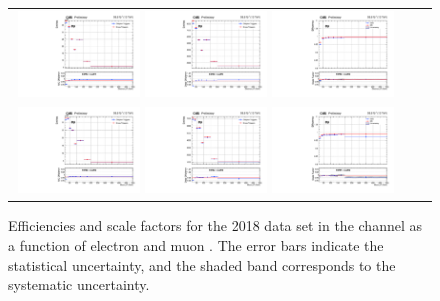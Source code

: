 {\begin{figure}[h]
  \begin{center}
    \begin{tabular}{ccc}
      \includegraphics[width=0.32\textwidth]{fig_2018_TrigSF/g_lepApt_emu_MC.pdf}
      \includegraphics[width=0.32\textwidth]{fig_2018_TrigSF/g_lepApt_emu_data.pdf}
      \includegraphics[width=0.32\textwidth]{fig_2018_TrigSF/g_emu_lepApt_FullSystUncBand.pdf}\\
      \includegraphics[width=0.32\textwidth]{fig_2018_TrigSF/g_lepBpt_emu_MC.pdf}
      \includegraphics[width=0.32\textwidth]{fig_2018_TrigSF/g_lepBpt_emu_data.pdf}
      \includegraphics[width=0.32\textwidth]{fig_2018_TrigSF/g_emu_lepBpt_FullSystUncBand.pdf}\\
    \end{tabular}
    \caption{Efficiencies and scale factors for the 2018 data set in the \emu channel as a function of electron and muon \pT.
            The error bars indicate the statistical uncertainty, and the shaded band corresponds to the systematic uncertainty.
            }
    \label{TrigSF_2018_1}
  \end{center}
\end{figure}

}
